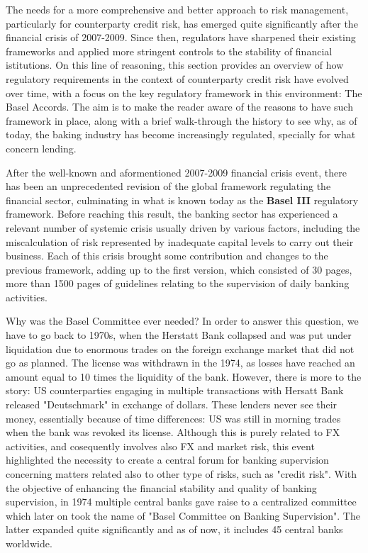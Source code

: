 \documentclass[a4paper,12pt]{article}
\begin{document}
    The needs for a more comprehensive and better approach to risk management, particularly for counterparty credit risk,
    has emerged quite significantly after the financial crisis of 2007-2009. Since then, regulators have sharpened their 
    existing frameworks and applied more stringent controls to the stability of financial istitutions. 
    On this line of reasoning, this section provides an overview of how regulatory requirements in the context of counterparty credit
    risk have evolved over time, with a focus on the key regulatory framework in this environment: The Basel Accords. The aim is to make 
    the reader aware of the reasons to have such framework in place, along with a brief walk-through the history to see why, as of today, 
    the baking industry has become increasingly regulated, specially for what concern lending.
    \newline

    After the well-known and aformentioned 2007-2009 financial crisis event, there has been an unprecedented
    revision of the global framework regulating the financial sector, culminating in what is known today as the \textbf{Basel III} regulatory framework.
    Before reaching this result, the banking sector has experienced a relevant number of systemic crisis usually driven by various factors,
    including the miscalculation of risk represented by inadequate capital levels to carry out their business. Each of this crisis brought some contribution 
    and changes to the previous framework, adding up to the first version, which consisted of 30 pages, more than 1500 pages of guidelines relating to the 
    supervision of daily banking activities. 
    \newline

    Why was the Basel Committee ever needed? In order to answer this question, we have to go back to 1970s, when the Herstatt Bank collapsed and was put under liquidation 
    due to enormous trades on the foreign exchange market that did not go as planned. The license was withdrawn in the 1974, as losses have reached an amount equal to 10 times
    the liquidity of the bank. However, there is more to the story: US counterparties engaging in multiple transactions with Hersatt Bank released "Deutschmark" in exchange of dollars.
    These lenders never see their money, essentially because of time differences: US was still in morning trades when the bank was revoked its license. Although this is purely related to FX activities, 
    and cosequently involves also FX and market risk, this event highlighted the necessity to create a central forum for banking supervision concerning matters related also to other type of risks, 
    such as "credit risk". With the objective of enhancing the financial stability and quality of banking supervision, in 1974 multiple central banks gave raise to a centralized committee which later on 
    took the name of "Basel Committee on Banking Supervision". The latter expanded quite significantly and as of now, it includes 45 central banks worldwide.
    \newline
\end{document}
